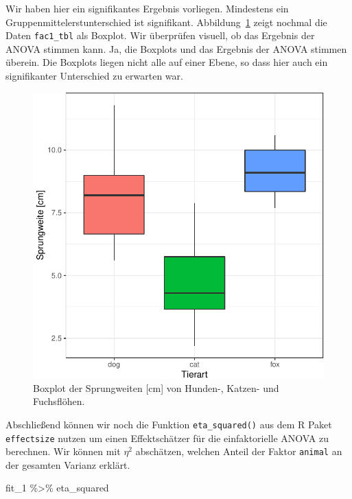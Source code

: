 \documentclass[
  letterpaper,
]{scrbook}
\newenvironment{Shaded}{\begin{snugshade}}{\end{snugshade}}
\newcommand{\NormalTok}[1]{\textcolor[rgb]{0.00,0.23,0.31}{#1}}
\newcommand{\SpecialCharTok}[1]{\textcolor[rgb]{0.37,0.37,0.37}{#1}}
\begin{document}
Wir haben hier ein signifikantes Ergebnis vorliegen. Mindestens ein
Gruppenmittelerstunterschied ist signifikant.
Abbildung~\ref{fig-boxplot-anova-1} zeigt nochmal die Daten
\texttt{fac1\_tbl} als Boxplot. Wir überprüfen visuell, ob das Ergebnis
der ANOVA stimmen kann. Ja, die Boxplots und das Ergebnis der ANOVA
stimmen überein. Die Boxplots liegen nicht alle auf einer Ebene, so dass
hier auch ein signifikanter Unterschied zu erwarten war.

\begin{figure}

{\centering \includegraphics{./stat-tests-anova_files/figure-pdf/fig-boxplot-anova-1-1.pdf}

}

\caption{\label{fig-boxplot-anova-1}Boxplot der Sprungweiten {[}cm{]}
von Hunden-, Katzen- und Fuchsflöhen.}

\end{figure}

Abschließend können wir noch die Funktion \texttt{eta\_squared()} aus
dem R Paket \texttt{effectsize} nutzen um einen Effektschätzer für die
einfaktorielle ANOVA zu berechnen. Wir können mit \(\eta^2\) abschätzen,
welchen Anteil der Faktor \texttt{animal} an der gesamten Varianz
erklärt.

\begin{Shaded}
\begin{Highlighting}[]
\NormalTok{fit\_1 }\SpecialCharTok{\%\textgreater{}\%}\NormalTok{ eta\_squared}
\end{Highlighting}
\end{Shaded}
\end{document}
